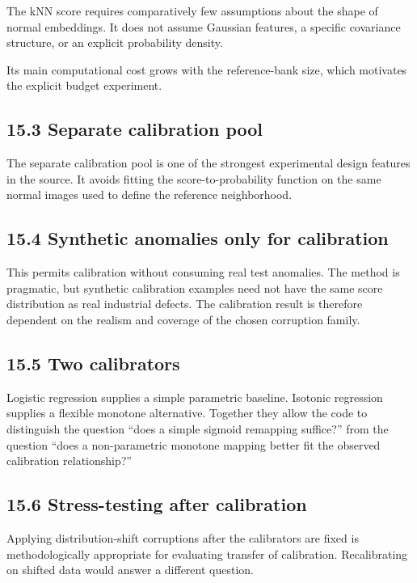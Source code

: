 \documentclass[
  11pt,
]{article}
\begin{document}
The kNN score requires comparatively few assumptions about the shape of
normal embeddings. It does not assume Gaussian features, a specific
covariance structure, or an explicit probability density.

Its main computational cost grows with the reference-bank size, which
motivates the explicit budget experiment.

\subsection{15.3 Separate calibration
pool}\label{separate-calibration-pool}

The separate calibration pool is one of the strongest experimental
design features in the source. It avoids fitting the
score-to-probability function on the same normal images used to define
the reference neighborhood.

\subsection{15.4 Synthetic anomalies only for
calibration}\label{synthetic-anomalies-only-for-calibration}

This permits calibration without consuming real test anomalies. The
method is pragmatic, but synthetic calibration examples need not have
the same score distribution as real industrial defects. The calibration
result is therefore dependent on the realism and coverage of the chosen
corruption family.

\subsection{15.5 Two calibrators}\label{two-calibrators}

Logistic regression supplies a simple parametric baseline. Isotonic
regression supplies a flexible monotone alternative. Together they allow
the code to distinguish the question ``does a simple sigmoid remapping
suffice?'' from the question ``does a non-parametric monotone mapping
better fit the observed calibration relationship?''

\subsection{15.6 Stress-testing after
calibration}\label{stress-testing-after-calibration}

Applying distribution-shift corruptions after the calibrators are fixed
is methodologically appropriate for evaluating transfer of calibration.
Recalibrating on shifted data would answer a different question.
\end{document}
